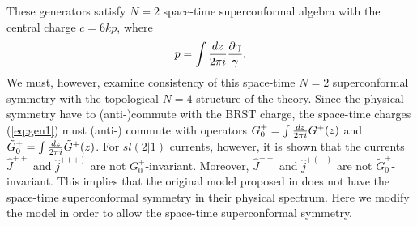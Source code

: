 \documentclass[a4paper,12pt]{article}
\begin{document}
These generators satisfy $N=2$ space-time superconformal algebra with
the central charge $c=6kp$, where
\begin{equation}
 p=\int {d z\over 2\pi i}{\partial \gamma\over \gamma}. 
\end{equation}
We must, however, examine consistency of this space-time $N=2$
 superconformal symmetry with the topological
$N=4$ structure of the theory. 
Since the physical symmetry
have to (anti-)commute with the BRST charge, the space-time
charges (\ref{eq:gen1}) must (anti-) commute with operators
$G^{+}_{0}=\int {dz\over 2\pi i}G^{+}(z)$ and
$\tilde{G}^{+}_{0}=\int {dz\over 2\pi i}\tilde{G}^{+}(z)$.
For $sl(2|1)$ currents, however,
it is shown that the currents $\hat{J}^{++}$ and $\hat{j}^{+(+)}$ are not
$G^{+}_{0}$-invariant.
Moreover, $\hat{J}^{++}$ and $\hat{j}^{+(-)}$ are not
$\tilde{G}^{+}_{0}$-invariant.
This implies that the original model proposed in \cite{GKP}
does not have the space-time superconformal symmetry
in their physical spectrum.
Here we modify the model in order to allow the space-time
superconformal symmetry.
\end{document}
